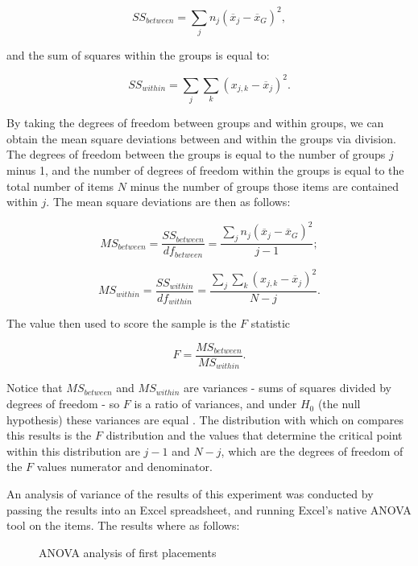 $$SS_{between} = \sum_{j}n_{j}(\overline{x}_{j}-\overline{x}_{G})^{2},$$

and the sum of squares within the groups is equal to:

$$SS_{within} = \sum_{j}\sum_{k}(x_{j,k} - \overline{x}_{j})^{2}.$$

By taking the degrees of freedom between groups and within groups, we can obtain
the mean square deviations between and within the groups via division. The
degrees of freedom between the groups is equal to the number of groups $j$ minus 1,
and the number of degrees of freedom within the groups is equal to the total
number of items $N$ minus the number of groups those items are contained within
$j$. The mean square deviations are then as follows:

$$MS_{between} = \frac{SS_{between}}{df_{between}} = \frac{\sum_{j}n_{j}(\overline{x}_{j}-\overline{x}_{G})^{2}}{j-1};$$

$$MS_{within} = \frac{SS_{within}}{df_{within}} = \frac{\sum_{j}\sum_{k}(x_{j,k}-\overline{x}_{j})^{2}}{N-j}.$$

The value then used to score the sample is the $F$ statistic

$$F = \frac{MS_{between}}{MS_{within}}.$$

Notice that $MS_{between}$ and $MS_{within}$ are variances - sums of squares
divided by degrees of freedom - so $F$ is a ratio of variances, and under $H_{0}$
(the null hypothesis) these variances are equal \cite{Cohen}. The distribution
with which on compares this results is the $F$ distribution and the values that
determine the critical point within this distribution are $j-1$ and $N-j$, which
are the degrees of freedom of the $F$ values numerator and denominator.

An analysis of variance of the results of this experiment was conducted by passing
the results into an Excel spreadsheet, and running Excel's native ANOVA tool on
the items. The results where as follows:

\begin{figure}[H]
\caption{ANOVA analysis of first placements}
\end{figure}

